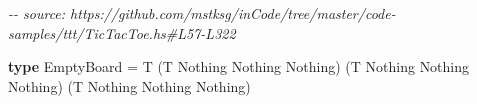 \documentclass[]{article}
\newenvironment{Shaded}{}{}
\newcommand{\CommentTok}[1]{\textcolor[rgb]{0.38,0.63,0.69}{\textit{#1}}}
\newcommand{\DataTypeTok}[1]{\textcolor[rgb]{0.56,0.13,0.00}{#1}}
\newcommand{\KeywordTok}[1]{\textcolor[rgb]{0.00,0.44,0.13}{\textbf{#1}}}
\newcommand{\NormalTok}[1]{#1}
\newcommand{\OtherTok}[1]{\textcolor[rgb]{0.00,0.44,0.13}{#1}}
\begin{document}
\begin{Shaded}
\begin{Highlighting}[]
\CommentTok{{-}{-} source: https://github.com/mstksg/inCode/tree/master/code{-}samples/ttt/TicTacToe.hs\#L57{-}L322}

\KeywordTok{type} \DataTypeTok{EmptyBoard} \OtherTok{=}
  \DataTypeTok{\textquotesingle{}T}
\NormalTok{    (}\DataTypeTok{\textquotesingle{}T} \DataTypeTok{\textquotesingle{}Nothing} \DataTypeTok{\textquotesingle{}Nothing} \DataTypeTok{\textquotesingle{}Nothing}\NormalTok{)}
\NormalTok{    (}\DataTypeTok{\textquotesingle{}T} \DataTypeTok{\textquotesingle{}Nothing} \DataTypeTok{\textquotesingle{}Nothing} \DataTypeTok{\textquotesingle{}Nothing}\NormalTok{)}
\NormalTok{    (}\DataTypeTok{\textquotesingle{}T} \DataTypeTok{\textquotesingle{}Nothing} \DataTypeTok{\textquotesingle{}Nothing} \DataTypeTok{\textquotesingle{}Nothing}\NormalTok{)}


\end{Highlighting}
\end{Shaded}
\end{document}
